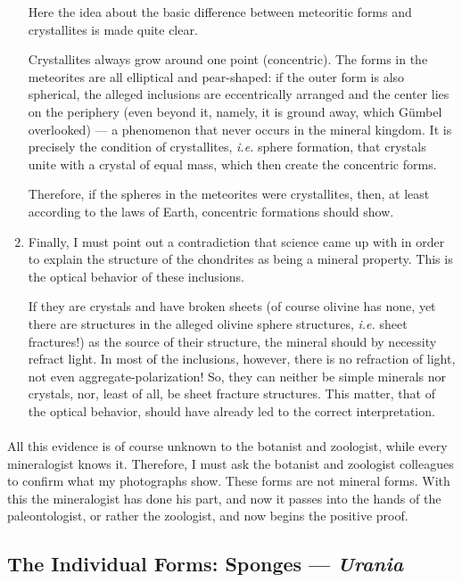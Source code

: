 \documentclass[a4paper, 12pt, oneside]{article}
\begin{document}
\begin{enumerate}
    Here the idea about the basic difference between meteoritic forms and crystallites is made quite clear.
    
    Crystallites always grow around one point (concentric). The forms in the meteorites are all elliptical and pear-shaped: if the outer form is also spherical, the alleged inclusions are eccentrically arranged and the center lies on the periphery (even beyond it, namely, it is ground away, which Gümbel overlooked) --- a phenomenon that never occurs in the mineral kingdom. It is precisely the condition of crystallites, \emph{i.e.} sphere formation, that crystals unite with a crystal of equal mass, which then create the concentric forms.
    
    Therefore, if the spheres in the meteorites were crystallites, then, at least according to the laws of Earth, concentric formations should show.
    \item Finally, I must point out a contradiction that science came up with in order to explain the structure of the chondrites as being a mineral property. This is the optical behavior of these inclusions.
    
    If they are crystals and have broken sheets (of course olivine has none, yet there are structures in the alleged olivine sphere structures, \emph{i.e.} sheet fractures!) as the source of their structure, the mineral should by necessity refract light. In most of the inclusions, however, there is no refraction of light, not even aggregate-polarization! So, they can neither be simple minerals nor crystals, nor, least of all, be sheet fracture structures. This matter, that of the optical behavior, should have already led to the correct interpretation.
\end{enumerate}
\paragraph*{}
All this evidence is of course unknown to the botanist and zoologist, while every mineralogist knows it. Therefore, I must ask the botanist and zoologist colleagues to confirm what my photographs show. These forms are not mineral forms. With this the mineralogist has done his part, and now it passes into the hands of the paleontologist, or rather the zoologist, and now begins the positive proof.
\clearpage
\subsection{The Individual Forms: Sponges --- \emph{Urania}}
\end{document}
